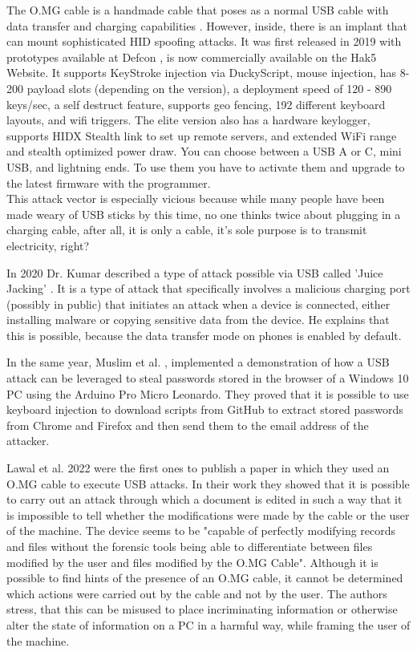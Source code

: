The O.MG cable is a handmade cable that poses as a normal USB cable with data transfer and charging capabilities \cite{hak5MGCable}. However, inside, there is an implant that can mount sophisticated HID spoofing attacks. It was first released in 2019 with prototypes available at Defcon \cite{MGCable2019a}, is now commercially available on the Hak5 Website. It supports KeyStroke injection via DuckyScript, mouse injection, has 8-200 payload slots (depending on the version), a deployment speed of 120 - 890 keys/sec, a self destruct feature, supports geo fencing, 192 different keyboard layouts, and wifi triggers. The elite version also has a hardware keylogger, supports HIDX Stealth link to set up remote servers, and extended WiFi range and stealth optimized power draw. 
You can choose between a USB A or C, mini USB, and lightning ends. To use them you have to activate them and upgrade to the latest firmware with the programmer. \\
This attack vector is especially vicious because while many people have been made weary of USB sticks by this time, no one thinks twice about plugging in a charging cable, after all, it is only a cable, it's sole purpose is to transmit electricity, right?

In 2020 Dr. Kumar described a type of attack possible via USB called 'Juice Jacking' \cite{kumarJuiceJackingUSB2020}. It is a type of attack that specifically involves a malicious charging port (possibly in public) that initiates an attack when a device is connected, either installing malware or copying sensitive data from the device. He explains that this is possible, because the data transfer mode on phones is enabled by default. 

In the same year, Muslim et al. \cite{muslimImplementationAnalysisUSB2020}, implemented a demonstration of how a USB attack can be leveraged to steal passwords stored in the browser of a Windows 10 PC using the Arduino Pro Micro Leonardo.  They proved that it is possible to use keyboard injection to download scripts from GitHub to extract stored passwords from Chrome and Firefox and then send them to the email address of the attacker. 

Lawal et al. \cite{lawalFacilitatingCyberenabledFraud2022} 2022 were the first ones to publish a paper in which they used an O.MG cable to execute USB attacks. In their work they showed that it is possible to carry out an attack through which a document is edited in such a way that it is impossible to tell whether the modifications were made by the cable or the user of the machine. The device seems to be "capable of perfectly modifying records and files without the forensic tools being able to differentiate between files modified by the user and files modified by the O.MG Cable". Although it is possible to find hints of the presence of an O.MG cable, it cannot be determined which actions were carried out by the cable and not by the user. The authors stress, that this can be misused to place incriminating information or otherwise alter the state of information on a PC in a harmful way, while framing the user of the machine. 


